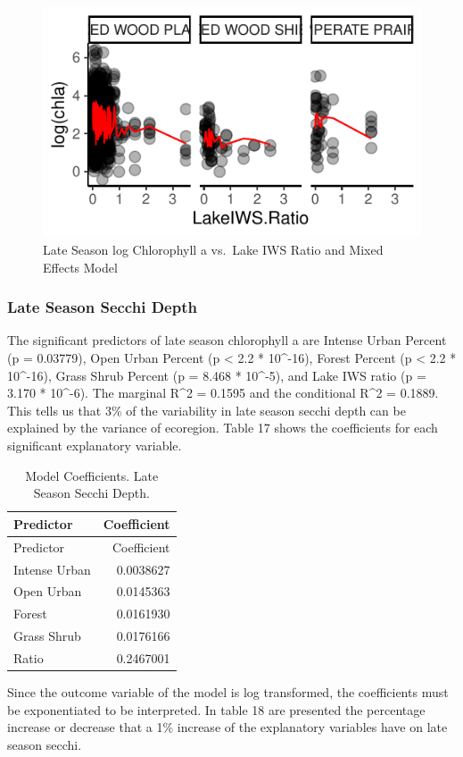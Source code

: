 \documentclass[12pt,]{article}
\begin{document}
\begin{figure}
\centering
\includegraphics{Bollt_Greif_Raby_Roth_Project_Final_files/figure-latex/unnamed-chunk-31-1.pdf}
\caption{Late Season log Chlorophyll a vs.~Lake IWS Ratio and Mixed
Effects Model}
\end{figure}

\hypertarget{late-season-secchi-depth}{%
\subsubsection{Late Season Secchi
Depth}\label{late-season-secchi-depth}}

The significant predictors of late season chlorophyll a are Intense
Urban Percent (p = 0.03779), Open Urban Percent (p \textless{} 2.2 *
10\^{}-16), Forest Percent (p \textless{} 2.2 * 10\^{}-16), Grass Shrub
Percent (p = 8.468 * 10\^{}-5), and Lake IWS ratio (p = 3.170 *
10\^{}-6). The marginal R\^{}2 = 0.1595 and the conditional R\^{}2 =
0.1889. This tells us that 3\% of the variability in late season secchi
depth can be explained by the variance of ecoregion. Table 17 shows the
coefficients for each significant explanatory variable.

\begin{longtable}[]{@{}lr@{}}
\caption{Model Coefficients. Late Season Secchi Depth.}\tabularnewline
\toprule
Predictor & Coefficient\tabularnewline
\midrule
\endfirsthead
\toprule
Predictor & Coefficient\tabularnewline
\midrule
\endhead
Intense Urban & 0.0038627\tabularnewline
Open Urban & 0.0145363\tabularnewline
Forest & 0.0161930\tabularnewline
Grass Shrub & 0.0176166\tabularnewline
Ratio & 0.2467001\tabularnewline
\bottomrule
\end{longtable}

Since the outcome variable of the model is log transformed, the
coefficients must be exponentiated to be interpreted. In table 18 are
presented the percentage increase or decrease that a 1\% increase of the
explanatory variables have on late season secchi.
\end{document}
